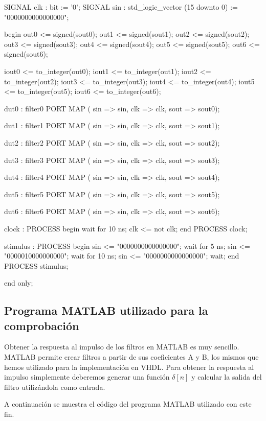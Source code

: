 \documentclass[a4paper,12pt]{article}
\begin{document}
\begin{vhdlcode}
SIGNAL clk   : bit := '0';
SIGNAL sin  : std_logic_vector (15 downto 0) 
            := "0000000000000000";

begin
out0 <= signed(sout0);
out1 <= signed(sout1);
out2 <= signed(sout2);
out3 <= signed(sout3);
out4 <= signed(sout4);
out5 <= signed(sout5);
out6 <= signed(sout6);

iout0 <= to_integer(out0);
iout1 <= to_integer(out1);
iout2 <= to_integer(out2);
iout3 <= to_integer(out3);
iout4 <= to_integer(out4);
iout5 <= to_integer(out5);
iout6 <= to_integer(out6);

dut0 : filter0 
   PORT MAP (
   sin => sin,
   clk => clk,
   sout => sout0);

dut1 : filter1 
   PORT MAP (
   sin => sin,
   clk => clk,
   sout => sout1);

dut2 : filter2 
   PORT MAP (
   sin => sin,
   clk => clk,
   sout => sout2);

dut3 : filter3 
   PORT MAP (
   sin => sin,
   clk => clk,
   sout => sout3);
   
dut4 : filter4
   PORT MAP (
     sin => sin,
     clk => clk,
     sout => sout4);

dut5 : filter5
   PORT MAP (
   sin => sin,
   clk => clk,
   sout => sout5);

dut6 : filter6 
   PORT MAP (
   sin => sin,
   clk => clk,
   sout => sout6);

clock : PROCESS
   begin
   wait for 10 ns; clk  <= not clk;
end PROCESS clock;

stimulus : PROCESS
   begin
   sin <= "0000000000000000";
   wait for 5 ns; sin  <= "0000010000000000";
   wait for 10 ns; sin  <= "0000000000000000";
   wait;
end PROCESS stimulus;

end only;
\end{vhdlcode}
\clearpage

\subsection{Programa MATLAB utilizado para la comprobación}
Obtener la respuesta al impulso de los filtros en MATLAB es muy sencillo. MATLAB permite crear filtros a partir de sus coeficientes A y B, los mismos que hemos utilizado para la implementación en VHDL. Para obtener la respuesta al impulso simplemente deberemos generar una función $\delta[n]$ y calcular la salida del filtro utilizándola como entrada.

A continuación se muestra el código del programa MATLAB utilizado con este fin.
\end{document}
